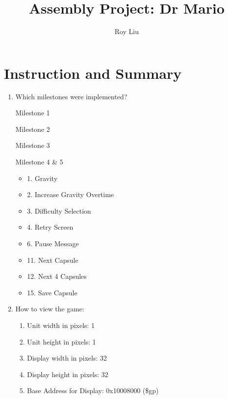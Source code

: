 \documentclass{article}
\title{Assembly Project: Dr Mario}
\author{Roy Liu}
\begin{document}
\maketitle

\section{Instruction and Summary}

\begin{enumerate}

    \item Which milestones were implemented? 
    
    Milestone 1
    
    Milestone 2
    
    Milestone 3
    
    Milestone 4 \& 5
    \begin{itemize}

    \item 1. Gravity
    \item 2. Increase Gravity Overtime
    \item 3. Difficulty Selection
    \item 4. Retry Screen
    \item 6. Pause Message
    \item 11. Next Capsule
    \item 12. Next 4 Capsules
    \item 15. Save Capsule
    
    \end{itemize}

    \item How to view the game:
    
    \begin{enumerate}
    
    \item Unit width in pixels:       1
    \item Unit height in pixels:      1
    \item Display width in pixels:    32
    \item Display height in pixels:   32
    \item Base Address for Display:   0x10008000 (\$gp)



\end{enumerate}
\end{enumerate}
\end{document}
